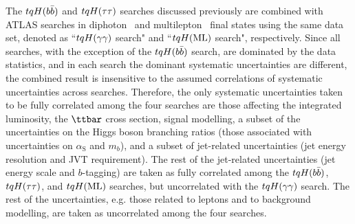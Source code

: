 The $tqH(b\bar{b})$ and $tqH(\tau\tau)$ searches discussed previously are combined with ATLAS searches in 
diphoton~\cite{Aaboud:2017mfd} and multilepton~\cite{Aaboud:2018pob} final states using the same data set, 
denoted as ``$tqH(\gamma\gamma)$ search" and ``$tqH(\mathrm{ML})$ search", respectively.
Since all searches, with the exception of the $tqH(b\bar{b})$ search, are dominated by the data statistics, 
and in each search the dominant systematic uncertainties are different, the combined result is 
insensitive to the assumed correlations of systematic uncertainties across searches.
Therefore, the only systematic uncertainties taken to be fully correlated among the four searches are 
those affecting the integrated luminosity, the $\ttbar$ cross section, signal modelling, a subset of the uncertainties
on the Higgs boson branching ratios (those associated with uncertainties on $\alpha_\mathrm{S}$ and $m_b$), 
and a subset of jet-related uncertainties (jet energy resolution and JVT requirement). 
The rest of the jet-related uncertainties (jet energy scale and $b$-tagging) are taken as fully correlated among 
the $tqH(b\bar{b})$, $tqH(\tau\tau)$, and $tqH(\mathrm{ML})$ searches, but uncorrelated with the $tqH(\gamma\gamma)$ search. The rest of the uncertainties, 
e.g. those related to leptons and to background modelling, are taken as uncorrelated among the four searches. 



